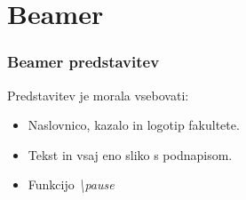 \documentclass{beamer}
\begin{document}
\section{Beamer}

\begin{frame}
\frametitle{Beamer predstavitev}

Predstavitev je morala vsebovati:
\begin{itemize}
    \item Naslovnico, kazalo in logotip fakultete.
\pause
    \item Tekst in vsaj eno sliko s podnapisom.
\pause
    \item Funkcijo \textit{\textbackslash}\textit{pause}
\end{itemize}
\end{frame}
\end{document}
